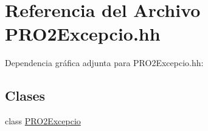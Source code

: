 \hypertarget{_p_r_o2_excepcio_8hh}{}\section{Referencia del Archivo P\+R\+O2\+Excepcio.\+hh}
\label{_p_r_o2_excepcio_8hh}
Dependencia gráfica adjunta para P\+R\+O2\+Excepcio.\+hh\+:
\subsection*{Clases}
\begin{DoxyCompactItemize}
\item 
class \hyperlink{class_p_r_o2_excepcio}{P\+R\+O2\+Excepcio}
\end{DoxyCompactItemize}
